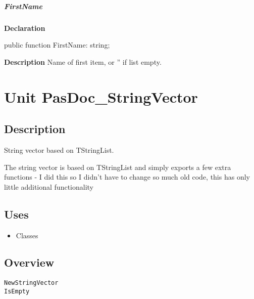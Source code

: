 \documentclass{report}
\newif\ifpdf
\begin{document}
\paragraph*{FirstName}\hspace*{\fill}

\label{PasDoc_StringPairVector.TStringPairVector-FirstName}
\begin{list}{}{
\setlength{\itemindent}{0cm}
\setlength{\listparindent}{0cm}
\setlength{\leftmargin}{\evensidemargin}
\addtolength{\leftmargin}{\tmplength}
\settowidth{\labelsep}{X}
\addtolength{\leftmargin}{\labelsep}
\setlength{\labelwidth}{\tmplength}
}
\item[\textbf{Declaration}\hfill]
\ifpdf
\begin{flushleft}
\fi
\begin{ttfamily}
public function FirstName: string;\end{ttfamily}

\ifpdf
\end{flushleft}
\fi

\par
\item[\textbf{Description}]
Name of first item, or '' if list empty.

\end{list}
\chapter{Unit PasDoc{\_}StringVector}
\label{PasDoc_StringVector}
\section{Description}
String vector based on TStringList.\hfill\vspace*{1ex}

   The string vector is based on TStringList and simply exports a few extra functions {-} I did this so I didn't have to change so much old code, this has only little additional functionality
\section{Uses}
\begin{itemize}
\item \begin{ttfamily}Classes\end{ttfamily}\end{itemize}
\section{Overview}
\begin{description}
\item[\texttt{\begin{ttfamily}TStringVector\end{ttfamily} Class}]
\end{description}
\begin{description}
\item[\texttt{NewStringVector}]
\item[\texttt{IsEmpty}]
\end{description}
\end{document}
